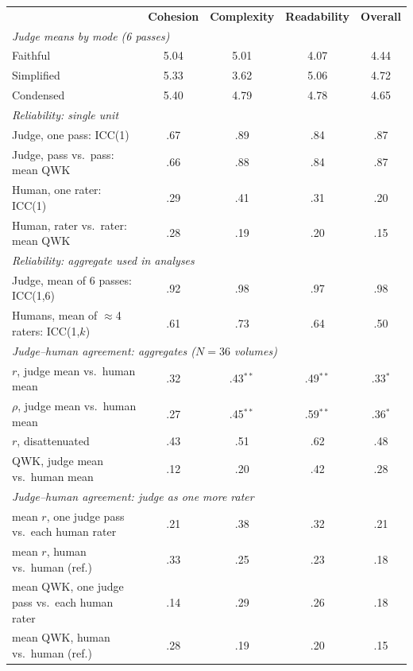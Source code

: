 \begin{table}[t]
   
  \begin{tabular}{lcccc}
    
    & \textbf{Cohesion} & \textbf{Complexity} & \textbf{Readability} & \textbf{Overall} \\
    
    \multicolumn{5}{l}{\emph{Judge means by mode (6 passes)}} \\
    \quad Faithful   & 5.04 & 5.01 & 4.07 & 4.44 \\
    \quad Simplified & 5.33 & 3.62 & 5.06 & 4.72 \\
    \quad Condensed  & 5.40 & 4.79 & 4.78 & 4.65 \\
    \multicolumn{5}{l}{\emph{Reliability: single unit}} \\
    \quad Judge, one pass: ICC(1)            & .67 & .89 & .84 & .87 \\
    \quad Judge, pass vs.\ pass: mean QWK    & .66 & .88 & .84 & .87 \\
    \quad Human, one rater: ICC(1)           & .29 & .41 & .31 & .20 \\
    \quad Human, rater vs.\ rater: mean QWK  & .28 & .19 & .20 & .15 \\
    \multicolumn{5}{l}{\emph{Reliability: aggregate used in analyses}} \\
    \quad Judge, mean of 6 passes: ICC(1,6)  & .92 & .98 & .97 & .98 \\
    \quad Humans, mean of $\approx$4 raters: ICC(1,$k$) & .61 & .73 & .64 & .50 \\
    \multicolumn{5}{l}{\emph{Judge--human agreement: aggregates ($N=36$ volumes)}} \\
    \quad $r$, judge mean vs.\ human mean    & .32 & .43$^{**}$ & .49$^{**}$ & .33$^{*}$ \\
    \quad $\rho$, judge mean vs.\ human mean & .27 & .45$^{**}$ & .59$^{**}$ & .36$^{*}$ \\
    \quad $r$, disattenuated                 & .43 & .51 & .62 & .48 \\
    \quad QWK, judge mean vs.\ human mean    & .12 & .20 & .42 & .28 \\
    \multicolumn{5}{l}{\emph{Judge--human agreement: judge as one more rater}} \\
    \quad mean $r$, one judge pass vs.\ each human rater   & .21 & .38 & .32 & .21 \\
    \quad mean $r$, human vs.\ human (ref.)                & .33 & .25 & .23 & .18 \\
    \quad mean QWK, one judge pass vs.\ each human rater & .14 & .29 & .26 & .18 \\
    \quad mean QWK, human vs.\ human (ref.)              & .28 & .19 & .20 & .15 \\
    

\end{tabular}
\end{table}
